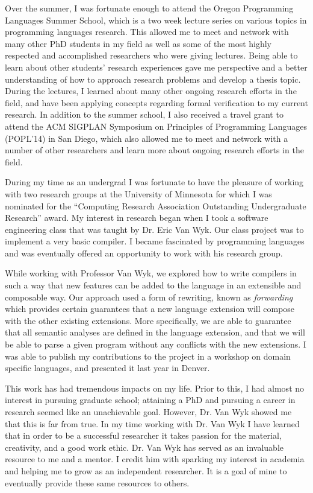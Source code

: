 \documentclass[12pt]{article}
\begin{document}
Over the summer, I was fortunate enough to attend the Oregon Programming Languages Summer School, which is a two week lecture series on various topics in programming languages research.  This allowed me to meet and network with many other PhD students in my field as well as some of the most highly respected and accomplished researchers who were giving lectures.  Being able to learn about other students' research experiences gave me perspective and a better understanding of how to approach research problems and develop a thesis topic.  During the lectures, I learned about many other ongoing research efforts in the field, and have been applying concepts regarding formal verification to my current research. In addition to the summer school, I also received a travel grant to attend the ACM SIGPLAN Symposium on Principles of Programming Languages (POPL'14) in San Diego, which also allowed me to meet and network with a number of other researchers and learn more about ongoing research efforts in the field.  

During my time as an undergrad I was fortunate to have the pleasure of working with two research groups at the University of Minnesota for which I was nominated for the ``Computing Research Association Outstanding Undergraduate Research'' award. My interest in research began when I took a software engineering class that was taught by Dr. Eric Van Wyk. Our class project was to implement a very basic compiler. I became fascinated by programming languages and was eventually offered an opportunity to work with his research group.

While working with Professor Van Wyk, we explored how to write compilers in such a way that new features can be added to the language in an extensible and composable way. Our approach used a form of rewriting, known as \emph{forwarding} which provides certain guarantees that a new language extension will compose with the other existing extensions. More specifically, we are able to guarantee that all semantic analyses are defined in the language extension, and that we will be able to parse a given program without any conflicts with the new extensions. I was able to publish my contributions to the project in a workshop on domain specific languages, and presented it last year in Denver.  

This work has had tremendous impacts on my life. Prior to this, I had almost no interest in pursuing graduate school; attaining a PhD and pursuing a career in research seemed like an unachievable goal. However, Dr. Van Wyk showed me that this is far from true. In my time working with Dr. Van Wyk I have learned that in order to be a successful researcher it takes passion for the material, creativity, and a good work ethic. Dr. Van Wyk has served as an invaluable resource to me and a mentor. I credit him with sparking my interest in academia and helping me to grow as an independent researcher. It is a goal of mine to eventually provide these same resources to others.
\end{document}
